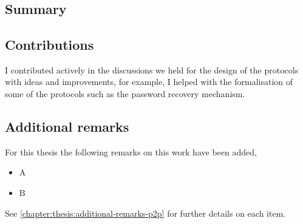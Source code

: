 

\section{}
\begingroup\centering
\begin{ppBox}
\end{ppBox}
\endgroup

\subsection{Summary}
    \label{subsection:summary-p2p}



\subsection{Contributions}
    \label{subsection:contributions-p2p}
I contributed actively in the discussions we held for the design of the protocols 
with ideas and improvements, for example, I helped with the formalisation of some 
of the protocols such as the password recovery mechanism. 

\subsection{Additional remarks}
    \label{subsection:additional-remarks-p2p}
For this thesis the following remarks on this work have been added,
\begin{itemize}
    \item A
    \item B
\end{itemize}
See \cref{chapter:thesis:additional-remarks-p2p} for further details on each item.

\section{}
\begingroup\centering
\begin{ppBox}
\end{ppBox}
\endgroup

